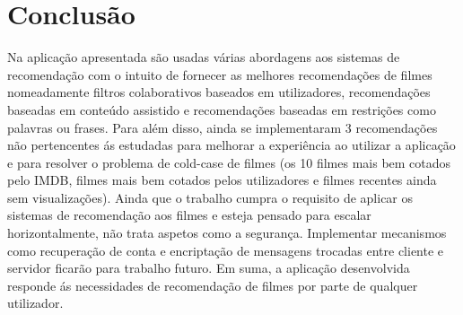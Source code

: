 \section{Conclusão}

Na aplicação apresentada são usadas várias abordagens aos sistemas de recomendação com o intuito de fornecer as melhores recomendações de filmes nomeadamente filtros colaborativos baseados em utilizadores, recomendações baseadas em conteúdo assistido e recomendações baseadas em restrições como palavras ou frases. Para além disso, ainda se implementaram 3 recomendações não pertencentes ás estudadas para melhorar a experiência ao utilizar a aplicação e para resolver o problema de cold-case de filmes (os 10 filmes mais bem cotados pelo IMDB, filmes mais bem cotados pelos utilizadores e filmes recentes ainda sem visualizações).
Ainda que o trabalho cumpra o requisito de aplicar os sistemas de recomendação aos filmes e esteja pensado para escalar horizontalmente, não trata aspetos como a segurança. Implementar mecanismos como recuperação de conta e encriptação de mensagens trocadas entre cliente e servidor ficarão para trabalho futuro.
Em suma, a aplicação desenvolvida responde ás necessidades de recomendação de filmes por parte de qualquer utilizador.

